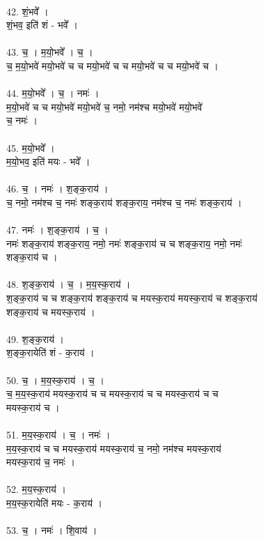\\
42. शं॒भवे᳚ ।\\
शं॒भव॒ इति॑ शं - भवे᳚ ।\\
\\
43. च॒ । म॒यो॒भवे᳚ । च॒ ।\\
च॒ म॒यो॒भवे॑ मयो॒भवे॑ च च मयो॒भवे॑ च च मयो॒भवे॑ च च मयो॒भवे॑ च ।\\
\\
44. म॒यो॒भवे᳚ । च॒ । नमः॑ ।\\
म॒यो॒भवे॑ च च मयो॒भवे॑ मयो॒भवे॑ च॒ नमो॒ नम॑श्च मयो॒भवे॑ मयो॒भवे॑\\
च॒ नमः॑ ।\\
\\
45. म॒यो॒भवे᳚ ।\\
म॒यो॒भव॒ इति॑ मयः - भवे᳚ ।\\
\\
46. च॒ । नमः॑ । श॒ङ्क॒राय॑ ।\\
च॒ नमो॒ नम॑श्च च॒ नमः॑ शङ्क॒राय॑ शङ्क॒राय॒ नम॑श्च च॒ नमः॑ शङ्क॒राय॑ ।\\
\\
47. नमः॑ । श॒ङ्क॒राय॑ । च॒ ।\\
नमः॑ शङ्क॒राय॑ शङ्क॒राय॒ नमो॒ नमः॑ शङ्क॒राय॑ च च शङ्क॒राय॒ नमो॒ नमः॑\\
शङ्क॒राय॑ च ।\\
\\
48. श॒ङ्क॒राय॑ । च॒ । म॒य॒स्क॒राय॑ ।\\
श॒ङ्क॒राय॑ च च शङ्क॒राय॑ शङ्क॒राय॑ च मयस्क॒राय॑ मयस्क॒राय॑ च शङ्क॒राय॑\\
शङ्क॒राय॑ च मयस्क॒राय॑ ।\\
\\
49. श॒ङ्क॒राय॑ ।\\
श॒ङ्क॒रायेति॑ शं - क॒राय॑ ।\\
\\
50. च॒ । म॒य॒स्क॒राय॑ । च॒ ।\\
च॒ म॒य॒स्क॒राय॑ मयस्क॒राय॑ च च मयस्क॒राय॑ च च मयस्क॒राय॑ च च\\
मयस्क॒राय॑ च ।\\
\\
51. म॒य॒स्क॒राय॑ । च॒ । नमः॑ ।\\
म॒य॒स्क॒राय॑ च च मयस्क॒राय॑ मयस्क॒राय॑ च॒ नमो॒ नम॑श्च मयस्क॒राय॑\\
मयस्क॒राय॑ च॒ नमः॑ ।\\
\\
52. म॒य॒स्क॒राय॑ ।\\
म॒य॒स्क॒रायेति॑ मयः - क॒राय॑ ।\\
\\
53. च॒ । नमः॑ । शि॒वाय॑ ।\\
